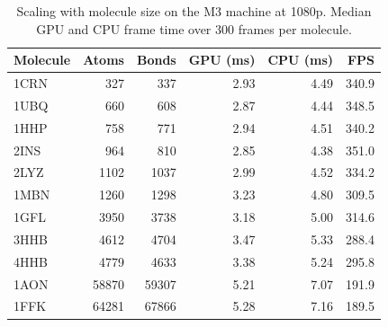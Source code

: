\begin{table}[H]
    \centering
    \small
    \begin{tabular}{lrrrrr}
        \toprule
        Molecule & Atoms & Bonds & GPU (ms) & CPU (ms) & FPS \\
        \midrule
        1CRN & 327 & 337 & 2.93 & 4.49 & 340.9 \\
        1UBQ & 660 & 608 & 2.87 & 4.44 & 348.5 \\
        1HHP & 758 & 771 & 2.94 & 4.51 & 340.2 \\
        2INS & 964 & 810 & 2.85 & 4.38 & 351.0 \\
        2LYZ & 1102 & 1037 & 2.99 & 4.52 & 334.2 \\
        1MBN & 1260 & 1298 & 3.23 & 4.80 & 309.5 \\
        1GFL & 3950 & 3738 & 3.18 & 5.00 & 314.6 \\
        3HHB & 4612 & 4704 & 3.47 & 5.33 & 288.4 \\
        4HHB & 4779 & 4633 & 3.38 & 5.24 & 295.8 \\
        1AON & 58870 & 59307 & 5.21 & 7.07 & 191.9 \\
        1FFK & 64281 & 67866 & 5.28 & 7.16 & 189.5 \\
        \bottomrule
    \end{tabular}
    \caption{Scaling with molecule size on the M3 machine at 1080p. Median GPU and CPU frame time over 300 frames per molecule.}
    \label{tab:scaling_m3}
\end{table}
